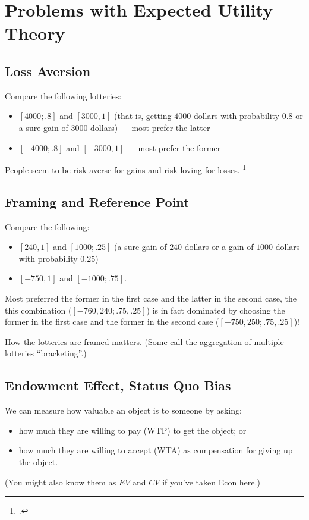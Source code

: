 \documentclass[oneside,reqno,letterpaper]{amsart}
\begin{document}
\section{Problems with Expected Utility Theory}
\subsection{Loss Aversion}
Compare the following lotteries:
\begin{itemize}
  \item \([4000; .8]\) and \([3000, 1]\) (that is, getting \(4000\) dollars with probability \(0.8\) or a sure gain of \(3000\) dollars) --- most prefer the latter
  \item \([-4000; .8]\) and \([-3000, 1]\) --- most prefer the former
\end{itemize}
People seem to be risk-averse for gains and risk-loving for losses.
\footnote{\Textcite{Schilbach2020Lecture}. }


\subsection{Framing and Reference Point}
Compare the following:
\begin{itemize}
  \item \([240, 1]\) and \([1000; .25]\) (a sure gain of \(240\) dollars or a gain of \(1000\) dollars with probability \(0.25\))
  \item \([-750, 1]\) and \([-1000; .75]\). 
\end{itemize}
Most preferred the former in the first case and the latter in the second case, the this combination (\([-760, 240; .75, .25]\)) is in fact dominated by choosing the former in the first case and the former in the second case (\([-750, 250; .75, .25]\))!

How the lotteries are framed matters.
(Some call the aggregation of multiple lotteries ``bracketing''.)


\subsection{Endowment Effect, Status Quo Bias}
We can measure how valuable an object is to someone by asking:
\begin{itemize}
  \item how much they are willing to pay (WTP) to get the object; or
  \item how much they are willing to accept (WTA) as compensation for giving up the object.
\end{itemize}
(You might also know them as \(EV\) and \(CV\) if you've taken Econ here.)
\end{document}
